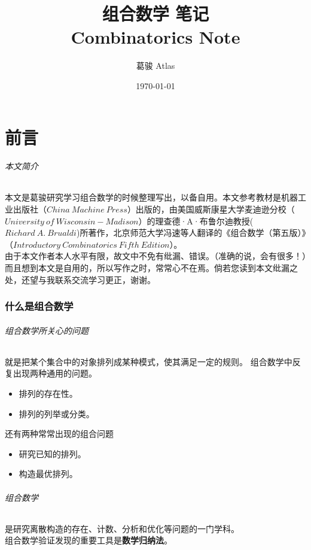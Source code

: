 \documentclass{ctexart}
\title{组合数学 笔记\\Combinatorics Note}
\author{葛骏 Atlas}
\date{\today}
\begin{document}
    \begin{titlepage}
        \maketitle
    \end{titlepage}
    \tableofcontents

    \part*{前言}
    \paragraph{本文简介} 本文是葛骏研究学习组合数学的时候整理写出，以备自用。本文参考教材是机器工业出版社（$China \ Machine \  Press$）出版的，由美国威斯康星大学麦迪逊分校（$University \ of \ Wisconsin-Madison$）的理查德·A·布鲁尔迪教授($Richard \ A. \ Brualdi$)所著作，北京师范大学冯速等人翻译的《组合数学（第五版）》（$Introductory \ Combinatorics \ Fifth \ Edition$）。\\
    由于本文作者本人水平有限，故文中不免有纰漏、错误。（准确的说，会有很多！）而且想到本文是自用的，所以写作之时，常常心不在焉。倘若您读到本文纰漏之处，还望与我联系交流学习更正，谢谢。
    \section{什么是组合数学}
    \paragraph{组合数学所关心的问题} 就是把某个集合中的对象排列成某种模式，使其满足一定的规则。
    组合数学中反复出现两种通用的问题。
    \begin{itemize}
        \item 排列的存在性。
        \item 排列的列举或分类。
    \end{itemize}

    还有两种常常出现的组合问题
    
    \begin{itemize}
        \item 研究已知的排列。
        \item 构造最优排列。
    \end{itemize}
    \paragraph{组合数学}是研究离散构造的存在、计数、分析和优化等问题的一门学科。\\
    组合数学验证发现的重要工具是\textbf{数学归纳法}。
\end{document}
